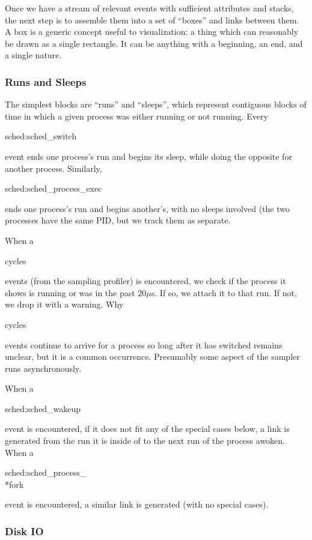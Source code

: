 \documentclass[10pt]{article}
\begin{document}
Once we have a stream of relevant events with sufficient attributes and stacks, the next step is to assemble them into a set of ``boxes'' and links between them.  A box is a generic concept useful to visualization: a thing which can reasonably be drawn as a single rectangle.  It can be anything with a beginning, an end, and a single nature.

\subsubsection{Runs and Sleeps}

The simplest blocks are ``runs'' and ``sleeps'', which represent contiguous blocks of time in which a given process was either running or not running.  Every \begin{tt}sched:sched\_switch\end{tt} event ends one process's run and begins its sleep, while doing the opposite for another process.  Similarly, \begin{tt}sched:sched\_process\_exec\end{tt} ends one process's run and begins another's, with no sleeps involved (the two processes have the same PID, but we track them as separate.

When a \begin{tt}cycles\end{tt} events (from the sampling profiler) is encountered, we check if the process it shows is running or was in the past $20 \mu$s.  If so, we attach it to that run.  If not, we drop it with a warning.  Why \begin{tt}cycles\end{tt} events continue to arrive for a process so long after it has switched remains unclear, but it is a common occurrence.  Presumably some aspect of the sampler runs asynchronously.

When a \begin{tt}sched:sched\_wakeup\end{tt} event is encountered, if it does not fit any of the special cases below, a link is generated from the run it is inside of to the next run of the process awoken.  When a \begin{tt}sched:sched\_process\_\\*fork\end{tt} event is encountered, a similar link is generated (with no special cases).

\subsubsection{Disk IO}
\end{document}
